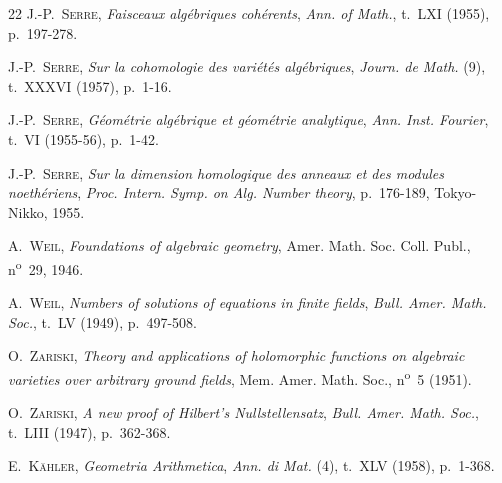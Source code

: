 \begin{thebibliography}{22}
J.-P.~\textsc{Serre}, \emph{Faisceaux algébriques cohérents},
\emph{Ann. of Math.}, t.~LXI (1955), p.~197-278.

J.-P.~\textsc{Serre},
\emph{Sur la cohomologie des variétés algébriques},
\emph{Journ. de Math.} (9), t.~XXXVI (1957), p.~1-16.

J.-P.~\textsc{Serre},
\emph{Géométrie algébrique et géométrie analytique},
\emph{Ann. Inst. Fourier}, t.~VI (1955-56), p.~1-42.

J.-P.~\textsc{Serre},
\emph{Sur la dimension homologique des anneaux et des modules noethériens},
\emph{Proc. Intern. Symp. on Alg. Number theory}, p.~176-189, Tokyo-Nikko,
1955.

A.~\textsc{Weil}, \emph{Foundations of algebraic geometry}, Amer. Math. Soc.
Coll. Publ., n\textsuperscript{o}~29, 1946.

A.~\textsc{Weil}, \emph{Numbers of solutions of equations in finite fields},
\emph{Bull. Amer. Math. Soc.}, t.~LV (1949), p.~497-508.

O.~\textsc{Zariski},
\emph{Theory and applications of holomorphic functions on algebraic varieties
over arbitrary ground fields}, Mem. Amer. Math. Soc., n\textsuperscript{o}~5
(1951).

O.~\textsc{Zariski}, \emph{A new proof of Hilbert's Nullstellensatz},
\emph{Bull. Amer. Math. Soc.}, t.~LIII (1947), p.~362-368.

E.~\textsc{Kähler}, \emph{Geometria Arithmetica},
\emph{Ann. di Mat.} (4), t.~XLV (1958), p.~1-368.

\end{thebibliography}
